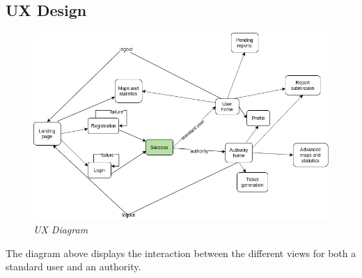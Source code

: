 \subsection{UX Design}
\begin{figure}[H]
  \centering
  \includegraphics[origin=c,width=\textwidth,height=.70\textheight,keepaspectratio]{DD_Images/UserInterface/UXDiagram.jpg}
  \caption{\textit{UX Diagram}}
\end{figure}

The diagram above displays the interaction between the different views for both a standard user and an authority.